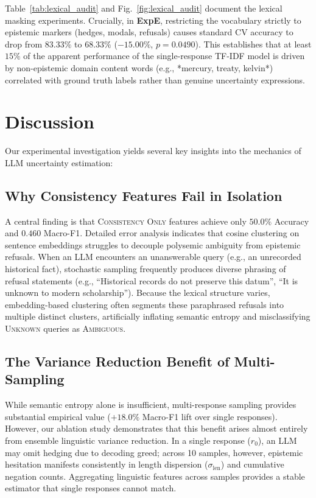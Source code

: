 \documentclass[conference]{IEEEtran}
\begin{document}
Table~\ref{tab:lexical_audit} and Fig.~\ref{fig:lexical_audit} document the lexical masking experiments. Crucially, in \textbf{ExpE}, restricting the vocabulary strictly to epistemic markers (hedges, modals, refusals) causes standard CV accuracy to drop from $83.33\%$ to $68.33\%$ ($-15.00\%$, $p=0.0490$). This establishes that at least $15\%$ of the apparent performance of the single-response TF-IDF model is driven by non-epistemic domain content words (e.g., *mercury, treaty, kelvin*) correlated with ground truth labels rather than genuine uncertainty expressions.

\section{Discussion}

Our experimental investigation yields several key insights into the mechanics of LLM uncertainty estimation:

\subsection{Why Consistency Features Fail in Isolation}
A central finding is that \textsc{Consistency Only} features achieve only $50.0\%$ Accuracy and $0.460$ Macro-F1. Detailed error analysis indicates that cosine clustering on sentence embeddings struggles to decouple polysemic ambiguity from epistemic refusals. When an LLM encounters an unanswerable query (e.g., an unrecorded historical fact), stochastic sampling frequently produces diverse phrasing of refusal statements (e.g., ``Historical records do not preserve this datum'', ``It is unknown to modern scholarship''). Because the lexical structure varies, embedding-based clustering often segments these paraphrased refusals into multiple distinct clusters, artificially inflating semantic entropy and misclassifying \textsc{Unknown} queries as \textsc{Ambiguous}.

\subsection{The Variance Reduction Benefit of Multi-Sampling}
While semantic entropy alone is insufficient, multi-response sampling provides substantial empirical value ($+18.0\%$ Macro-F1 lift over single responses). However, our ablation study demonstrates that this benefit arises almost entirely from ensemble linguistic variance reduction. In a single response ($r_0$), an LLM may omit hedging due to decoding greed; across 10 samples, however, epistemic hesitation manifests consistently in length dispersion ($\sigma_{\text{len}}$) and cumulative negation counts. Aggregating linguistic features across samples provides a stable estimator that single responses cannot match.
\end{document}
